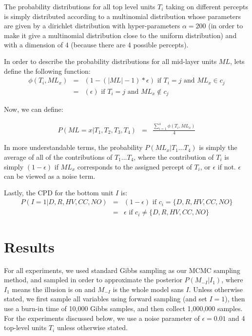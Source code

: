\documentclass{article} %
\begin{document}
The probability distributions for all top level units $T_i$ taking on different percepts is simply distributed according to a multinomial distribution whose parameters are given by a dirichlet distribution with hyper-parameters $\alpha = 200$ (in order to make it give a multinomial distribution close to the uniform distribution) and with a dimension of 4 (because there are 4 possible percepts).

In order to describe the probability distributions for all mid-layer units $ML$, lets define the following function:
\begin{eqnarray*}
\phi(T_i, ML_x) &=& (1-(|ML|-1)*\epsilon) \textrm{  if } T_i = j \textrm{ and } ML_x \in c_j \\
&=& (\epsilon) \textrm{  if } T_i = j \textrm{ and } ML_x \notin c_j 
\end{eqnarray*}

Now, we can define:

\begin{eqnarray*}
P(ML = x|T_1,T_2,T_3,T_4) &=& \frac{\sum_{i=1}^4 \phi(T_i, ML_x)}{4} 
\end{eqnarray*}

In more understandable terms, the probability $P(ML_x|T_1...T_4)$ is simply the average of all of the contributions of $T_1...T_4$, where the contribution of $T_i$ is simply $(1-\epsilon)$ if $ML_x$ corresponds to the assigned percept of $T_i$, or $\epsilon$ if not. $\epsilon$ can be viewed as a noise term.

Lastly, the CPD for the bottom unit $I$ is:
\begin{eqnarray*}
P(I=1|D,R,HV,CC,NO) &=& (1-\epsilon) \textrm{   if } c_i = \{D,R,HV,CC,NO\} \\
&=& \epsilon \textrm{   if } c_i \neq \{D,R,HV,CC,NO\}  
\end{eqnarray*}


\section{Results}
For all experiments, we used standard Gibbs sampling as our MCMC sampling method, and sampled in order to approximate the posterior $P(M_{-I}|I_1)$, where $I_1$ means the illusion is on and $M_{-I}$ is the whole model sans $I$. Unless otherwise stated, we first sample all variables using forward sampling (and set $I=1$), then use a burn-in time of 10,000 Gibbs samples, and then collect 1,000,000 samples. 
For the experiments discussed below, we use a noise parameter of $\epsilon = 0.01$ and 4 top-level units $T_i$ unless otherwise stated.  
\end{document}
